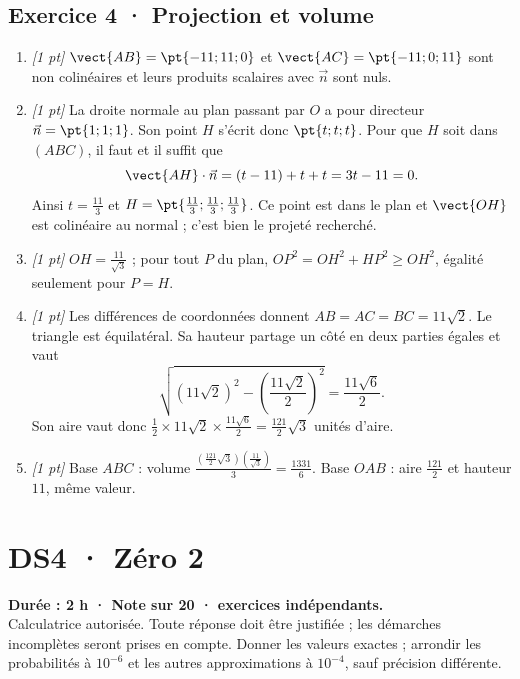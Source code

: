 \subsection*{Exercice 4 · Projection et volume}\begin{enumerate}

\item \textit{[1 pt]} $\vect{AB}=\pt{-11;11;0}$ et $\vect{AC}=\pt{-11;0;11}$ sont non colinéaires et leurs produits scalaires avec $\vec n$ sont nuls.

\item \textit{[1 pt]} La droite normale au plan passant par $O$ a pour directeur $\vec n=\pt{1;1;1}$. Son point $H$ s'écrit donc $\pt{t;t;t}$. Pour que $H$ soit dans $(ABC)$, il faut et il suffit que
\[\vect{AH}\cdot\vec n=(t-11)+t+t=3t-11=0.\]
Ainsi $t=\frac{11}{3}$ et $H=\pt{\frac{11}{3};\frac{11}{3};\frac{11}{3}}$. Ce point est dans le plan et $\vect{OH}$ est colinéaire au normal ; c'est bien le projeté recherché.

\item \textit{[1 pt]} $OH=\frac{11}{\sqrt{3}}$ ; pour tout $P$ du plan, $OP^2=OH^2+HP^2\ge OH^2$, égalité seulement pour $P=H$.

\item \textit{[1 pt]} Les différences de coordonnées donnent $AB=AC=BC=11\sqrt2$. Le triangle est équilatéral. Sa hauteur partage un côté en deux parties égales et vaut
\[\sqrt{(11\sqrt2)^2-(\frac{11\sqrt{2}}{2})^2}=\frac{11\sqrt6}{2}.\]
Son aire vaut donc $\frac12\times 11\sqrt2\times\frac{11\sqrt6}{2}=\frac{121}{2}\sqrt3$ unités d'aire.

\item \textit{[1 pt]} Base $ABC$ : volume $\frac{(\frac{121}{2}\sqrt3)(\frac{11}{\sqrt{3}})}{3}=\frac{1331}{6}$. Base $OAB$ : aire $\frac{121}{2}$ et hauteur $11$, même valeur.

\end{enumerate}

\fi

\mxnewpage{}\label{sujet:6-2}

\section*{DS4 · Zéro 2}


\textbf{Durée : 2 h · Note sur 20 ·  exercices indépendants.}\\Calculatrice autorisée. Toute réponse doit être justifiée ; les démarches incomplètes seront prises en compte. Donner les valeurs exactes ; arrondir les probabilités à $10^{-6}$ et les autres approximations à $10^{-4}$, sauf précision différente.

